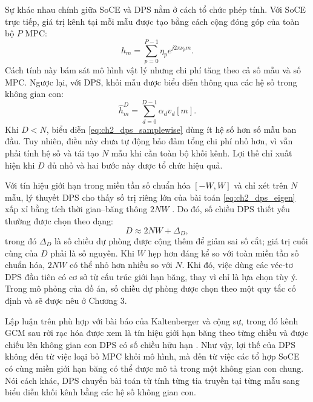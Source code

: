 Sự khác nhau chính giữa SoCE và DPS nằm ở cách tổ chức phép tính. Với SoCE trực tiếp, giá trị kênh tại mỗi mẫu được tạo bằng cách cộng đóng góp của toàn bộ \(P\) MPC:
\begin{equation}
h_m
=\sum_{p=0}^{P-1}\eta_p e^{j2\pi\nu_p m}.
\label{eq:ch2_soce_samplewise}
\end{equation}
Cách tính này bám sát mô hình vật lý nhưng chi phí tăng theo cả số mẫu và số MPC. Ngược lại, với DPS, khối mẫu được biểu diễn thông qua các hệ số trong không gian con:
\begin{equation}
\hat{h}_m^{D}
= \sum_{d=0}^{D-1}\alpha_d v_d[m].
\label{eq:ch2_dps_samplewise}
\end{equation}
Khi \(D<N\), biểu diễn \eqref{eq:ch2_dps_samplewise} dùng ít hệ số hơn số mẫu ban đầu. Tuy nhiên, điều này chưa tự động bảo đảm tổng chi phí nhỏ hơn, vì vẫn phải tính hệ số và tái tạo \(N\) mẫu khi cần toàn bộ khối kênh. Lợi thế chỉ xuất hiện khi \(D\) đủ nhỏ và hai bước này được tổ chức hiệu quả.

Với tín hiệu giới hạn trong miền tần số chuẩn hóa \([-W,W]\) và chỉ xét trên \(N\) mẫu, lý thuyết DPS cho thấy số trị riêng lớn của bài toán \eqref{eq:ch2_dps_eigen} xấp xỉ bằng tích thời gian--băng thông \(2NW\) \cite{Slepian1978}. Do đó, số chiều DPS thiết yếu thường được chọn theo dạng:
\begin{equation}
D \approx 2NW + \Delta_D,
\label{eq:ch2_essential_dimension}
\end{equation}
trong đó \(\Delta_D\) là số chiều dự phòng được cộng thêm để giảm sai số cắt; giá trị cuối cùng của \(D\) phải là số nguyên. Khi \(W\) hẹp hơn đáng kể so với toàn miền tần số chuẩn hóa, \(2NW\) có thể nhỏ hơn nhiều so với \(N\). Khi đó, việc dùng các véc-tơ DPS đầu tiên có cơ sở từ cấu trúc giới hạn băng, thay vì chỉ là lựa chọn tùy ý. Trong mô phỏng của đồ án, số chiều dự phòng được chọn theo một quy tắc cố định và sẽ được nêu ở Chương 3.

Lập luận trên phù hợp với bài báo của Kaltenberger và cộng sự, trong đó kênh GCM sau rời rạc hóa được xem là tín hiệu giới hạn băng theo từng chiều và được chiếu lên không gian con DPS có số chiều hữu hạn \cite{Kaltenberger2007}. Như vậy, lợi thế của DPS không đến từ việc loại bỏ MPC khỏi mô hình, mà đến từ việc các tổ hợp SoCE có cùng miền giới hạn băng có thể được mô tả trong một không gian con chung. Nói cách khác, DPS chuyển bài toán từ tính từng tia truyền tại từng mẫu sang biểu diễn khối kênh bằng các hệ số không gian con.

